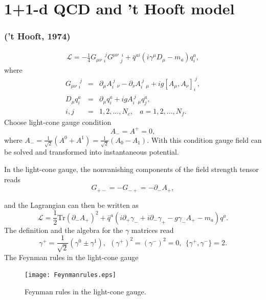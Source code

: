 \documentclass[8pt]{beamer}
\begin{document}
\section{1+1-d QCD and 't Hooft model }
\begin{frame}
	\frametitle{\insertsectionhead ('t Hooft, 1974)}
	\begin{eqnarray}
		\mathcal{L}=-\frac{1}{4}G_{\mu\nu}\ _{i}^{\ j}G^{\mu\nu}\ _{j}^{\
		i}+\bar q^{a i}(i\gamma^\mu D_\mu-m_a)q_i^a,
	\end{eqnarray}
	where
	\begin{eqnarray}
		G_{\mu\nu}\ _{i}^{\ j}&=&\partial_{\mu} A_{i}^{\ j}\
		_{\nu}-\partial_\nu A_{i}^{\ j}\ _{\mu}+i g[A_\mu,A_\nu]_{i}^{\
				j},\nonumber\\
		D_\mu q_i^a&=&\partial_\mu q_i^a+ig A_i^{\ j}\ _\mu q_j^a,\nonumber\\
		i,j&=&1,2,...,N_c, \ \ \ \ a=1,2,...,N_f.
	\end{eqnarray}
	Choose light-cone gauge condition
	\begin{equation}
		A_{-}=A^{+}=0,
	\end{equation}
	where
	$A_{-}=\frac{1}{\sqrt{2}}(A^0+A^1)=\frac{1}{\sqrt{2}}(A_0-A_1)$. With this condition gauge field can be solved and transformed into instantaneous potential.

	In
	the light-cone gauge, the nonvanishing components of the field
	strength tensor reads
	\begin{equation}
		G_{+-}=-G_{-+}=-\partial_{-}A_{+},
	\end{equation}


\end{frame}

\begin{frame}
	and the Lagrangian can then be written as
	\begin{equation}
		\mathcal{L}=\frac{1}{2}\mbox{Tr}(\partial_{-}A_{+})^2+\bar
		q^a(i\partial_{+}\gamma_{-}+i\partial_{-}\gamma_{+}-g\gamma_{-}A_{+}-m_a)q^a.
	\end{equation}
	The definition and the algebra for the $\gamma$ matrices read
	\begin{equation}
		\gamma^{+}=\frac{1}{\sqrt{2}}(\gamma^0\pm \gamma^1),\ \
		(\gamma^+)^2=(\gamma^-)^2=0,\ \ \{\gamma^+,\gamma^-\}=2.
	\end{equation}
	The Feynman rules in the light-cone gauge
	\begin{figure}[hbt]
		\begin{center}
			\texttt{[image: Feynmanrules.eps]}\\
			\caption{Feynman rules in the light-cone gauge.}\label{Feynmanrules}
		\end{center}
	\end{figure}

\end{frame}
\end{document}
